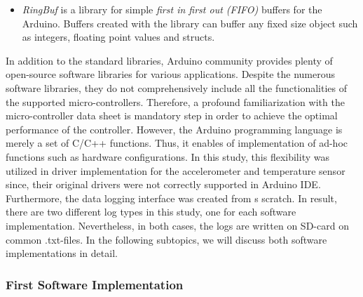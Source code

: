 \documentclass[english,12pt,a4paper,pdftex,elec,utf8]{aaltothesis}
\begin{document}
\begin{itemize}
\item \textit{RingBuf} is a library for simple \textit{first in first out (FIFO)} buffers for the Arduino. Buffers created with the library can buffer any fixed size object such as integers, floating point values and structs. \cite{arduinoringbuf}
\end{itemize} In addition to the standard libraries, Arduino community provides plenty of open-source software libraries for various applications. Despite the numerous software libraries, they do not comprehensively include all the functionalities of the supported micro-controllers. Therefore, a profound familiarization with the micro-controller data sheet is mandatory step in order to achieve the optimal performance of the controller. However, the Arduino programming language is merely a set of C/C++ functions. Thus, it enables of implementation of ad-hoc functions such as hardware configurations. In this study, this flexibility was utilized in driver implementation for the accelerometer and temperature sensor since, their original drivers were not correctly supported in Arduino IDE. Furthermore, the data logging interface was created from s scratch. In result, there are two different log types in this study, one for each software implementation. Nevertheless, in both cases, the logs are written on SD-card on common .txt-files. In the following subtopics, we will discuss both software implementations in detail.



\subsubsection*{First Software Implementation}\label{firstdatasetconfigurations}



\end{document}
